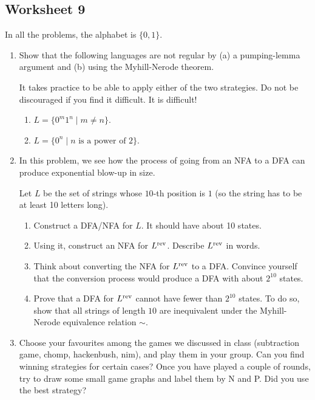 \documentclass{amsart}
\begin{document}
\subsection{Worksheet 9}
\label{sec:orgf574d33}
\togglefalse{solutions}
In all the problems, the alphabet is \(\{0,1\}\).

\begin{enumerate}
\item Show that the following languages are not regular by (a) a pumping-lemma argument and (b) using the Myhill-Nerode theorem.

It takes practice to be able to apply either of the two strategies.
Do not be discouraged if you find it difficult.  It is difficult!

\begin{enumerate}
\item \(L = \{0^m 1^n \mid m \neq n\}\).

\item \(L = \{0^{n} \mid n \text{ is a power of 2}\}\).
\end{enumerate}

\item In this problem, we see how the process of going from an NFA to a DFA can produce exponential blow-up in size.

Let \(L\) be the set of strings whose \(10\)-th position is \(1\) (so the string has to be at least 10 letters long).
\begin{enumerate}
\item Construct a DFA/NFA for \(L\).  It should have about 10 states.
\item Using it, construct an NFA for \(L^{\rm rev}\). Describe \(L^{\rm rev}\) in words.
\item Think about converting the NFA for \(L^{\rm rev}\) to a DFA.
Convince yourself that the conversion process would produce a DFA with about \(2^{10}\) states.
\item Prove that a DFA for \(L^{\rm rev}\) cannot have fewer than \(2^{10}\) states.
To do so, show that all strings of length \(10\) are inequivalent under the Myhill-Nerode equivalence relation \(\sim\).
\end{enumerate}

\item Choose your favourites among the games we discussed in class (subtraction game, chomp, hackenbush, nim), and play them in your group. Can you find winning strategies for certain cases? Once you have played a couple of rounds, try to draw some small game graphs and label them by N and P. Did you use the best strategy?
\end{enumerate}
\end{document}
